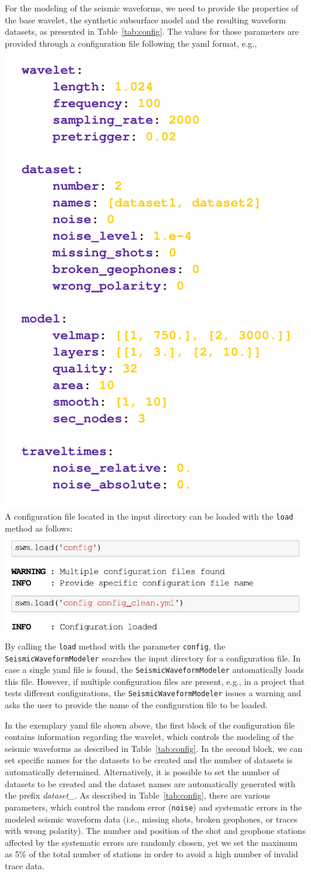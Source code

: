 \documentclass[a4paper,fleqn]{cas-sc}
\begin{document}
For the modeling of the seismic waveforms, we need to provide the properties of the base wavelet, the synthetic subsurface model and the resulting waveform datasets, as presented in Table~\ref{tab:config}. The values for those parameters are provided through a configuration file following the yaml format, e.g.,
\newline
\includegraphics[width=.3\textwidth]{./figures/yaml_file.pdf}
\newline
A configuration file located in the input directory can be loaded with the \texttt{load} method as follows:
\newline
\includegraphics[width=.5\textwidth]{./figures/load_config.pdf}
\newline
By calling the \texttt{load} method with the parameter \texttt{config}, the \texttt{SeismicWaveformModeler} searches the input directory for a configuration file. 
In case a single yaml file is found, the \texttt{SeismicWaveformModeler} automatically loads this file. However, if multiple configuration files are present, e.g., in a project that tests different configurations, the \texttt{SeismicWaveformModeler} issues a warning and asks the user to provide the name of the configuration file to be loaded. 

In the exemplary yaml file shown above, the first block of the configuration file contains information regarding the wavelet, which controls the modeling of the seismic waveforms as described in Table~\ref{tab:config}.
In the second block, we can set specific names for the datasets to be created and the number of datasets is automatically determined. Alternatively, it is possible to set the number of datasets to be created and the dataset names are automatically generated with the prefix \textit{dataset\_}.
As described in Table~\ref{tab:config}, there are various parameters, which control the random error (\texttt{noise}) and systematic errors in the modeled seismic waveform data (i.e., missing shots, broken geophones, or traces with wrong polarity).
The number and position of the shot and geophone stations affected by the systematic errors are randomly chosen, yet we set the maximum as 5\% of the total number of stations in order to avoid a high number of invalid trace data.
\end{document}

